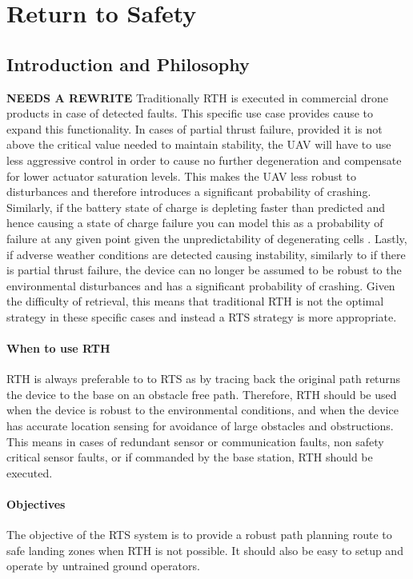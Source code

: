 \newpage
{}
\section{Return to Safety} \label{Return to Safety}

\subsection{Introduction and Philosophy}
\textbf{NEEDS A REWRITE}
Traditionally \gls{RTH} is executed in commercial drone products in case of detected faults. This specific use case provides cause to expand this functionality. In cases of partial thrust failure, provided it is not above the critical value needed to maintain stability, the \gls{UAV} will have to use less aggressive control in order to cause no further degeneration and compensate for lower actuator saturation levels. This makes the \gls{UAV} less robust to disturbances and therefore introduces a significant probability of crashing. Similarly, if the battery state of charge is depleting faster than predicted and hence causing a state of charge failure you can model this as a probability of failure at any given point given the unpredictability of degenerating cells \cite{REF}. Lastly, if adverse weather conditions are detected causing instability, similarly to if there is partial thrust failure, the device can no longer be assumed to be robust to the environmental disturbances and has a significant probability of crashing. Given the difficulty of retrieval, this means that traditional \gls{RTH} is not the optimal strategy in these specific cases and instead a \gls{RTS} strategy is more appropriate.
\paragraph{When to use \gls{RTH}}
\gls{RTH} is always preferable to to \gls{RTS} as by tracing back the original path returns the device to the base on an obstacle free path. Therefore, \gls{RTH} should be used when the device is robust to the environmental conditions, and when the device has accurate location sensing for avoidance of large obstacles and obstructions. This means in cases of redundant sensor or communication faults, non safety critical sensor faults, or if commanded by the base station, \gls{RTH} should be executed.
\paragraph{Objectives}
The objective of the \gls{RTS} system is to provide a robust path planning route to safe landing zones when \gls{RTH} is not possible. It should also be easy to setup and operate by untrained ground operators.



